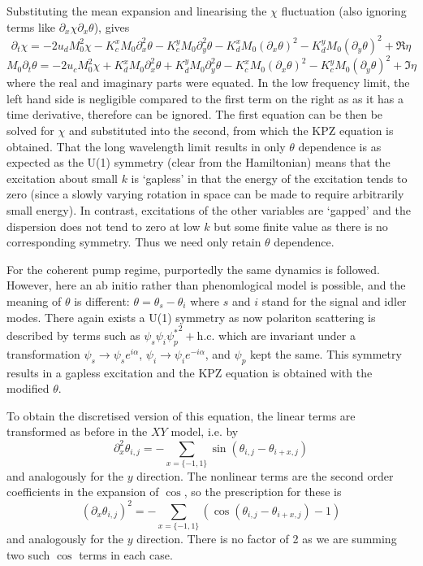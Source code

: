 Substituting the mean expansion and linearising the $\chi$ fluctuation (also ignoring terms like $\partial_x \chi \partial_x \theta$), gives
\[
\partial_t \chi = -2u_d M_0^2 \chi - K_c^x M_0 \partial_x^2 \theta -K_c^y M_0 \partial_y^2 \theta - K_d^x M_0(\partial_x \theta)^2 -K_d^y M_0(\partial_y \theta)^2 + \Re \eta
\]
\[
M_0\partial_t \theta = -2u_c M_0^2 \chi + K_d^x M_0 \partial_x^2 \theta +K_d^y M_0 \partial_y^2 \theta - K_c^x M_0(\partial_x \theta)^2 -K_c^y M_0(\partial_y \theta)^2 + \Im \eta
\]
where the real and imaginary parts were equated. In the low frequency limit, the left hand side is negligible compared to the first term on the right as as it has a time derivative, therefore can be ignored. The first equation can be then be solved for $\chi$ and substituted into the second, from which the KPZ equation is obtained. That the long wavelength limit results in only $\theta$ dependence is as expected as the U(1) symmetry (clear from the Hamiltonian) means that the excitation about small $k$ is `gapless' in that the energy of the excitation tends to zero (since a slowly varying rotation in space can be made to require arbitrarily small energy). In contrast, excitations of the other variables are `gapped' and the dispersion does not tend to zero at low $k$ but some finite value as there is no corresponding symmetry. Thus we need only retain $\theta$ dependence.

For the coherent pump regime, purportedly the same dynamics is followed. However, here an ab initio rather than phenomlogical model is possible, and the meaning of $\theta$ is different: $\theta = \theta_s - \theta_i$ where $s$ and $i$ stand for the signal and idler modes. There again exists a U(1) symmetry as now polariton scattering is described by terms such as $\psi_s\psi_i{\psi_p^*}^2 + \text{h.c.}$ which are invariant under a transformation $\psi_s \to \psi_se^{i\alpha}$, $\psi_i \to \psi_ie^{-i\alpha}$, and $\psi_p$ kept the same. This symmetry
results in a gapless excitation and the KPZ equation is obtained with the modified $\theta$.

To obtain the discretised version of this equation, the linear terms are transformed as before in the $XY$ model, i.e. by 
\[
\partial_x^2 \theta_{i,j}  = -\sum_{x=\{-1,1\}} \sin(\theta_{i,j} - \theta_{i+x,j})
\]
and analogously for the $y$ direction. The nonlinear terms are the second order coefficients in the expansion of $\cos$, so the prescription for these is
\[
(\partial_x \theta_{i,j})^2  = -\sum_{x=\{-1,1\}} (\cos(\theta_{i,j} - \theta_{i+x,j})- 1)
\]
and analogously for the $y$ direction. There is no factor of 2 as we are summing two such $\cos$ terms in each case. 

